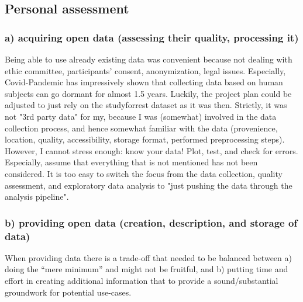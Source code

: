 \pagebreak


\subsection{Personal assessment}





\subsubsection{a) acquiring open data (assessing their quality, processing it)}

%
Being able to use already existing data was convenient because not dealing with
ethic committee, participants' consent, anonymization, legal issues.
%
Especially, Covid-Pandemic has impressively shown that collecting data based on
human subjects can go dormant for almost 1.5 years.
%
Luckily, the project plan could be adjusted to just rely on the studyforrest
dataset as it was then.
%
Strictly, it was not "3rd party data" for my, because I was (somewhat) involved
in the data collection process, and hence somewhat familiar with the data
(provenience, location, quality, accessibility, storage format, performed
preprocessing steps).
%
However, I cannot stress enough: know your data! Plot, test, and check for
errors.
%
Especially, assume that everything that is not mentioned has not been
considered.
%
It is too easy to switch the focus from the data collection, quality assessment,
and exploratory data analysis to "just pushing the data through the analysis
pipeline".



\subsubsection{b) providing open data (creation, description, and storage of
data)}



When providing data there is a trade-off that needed to be balanced between a)
doing the ``mere minimum'' and  might not be fruitful, and b) putting time and
effort in creating additional information that to provide a sound/substantial
groundwork for potential use-cases.

